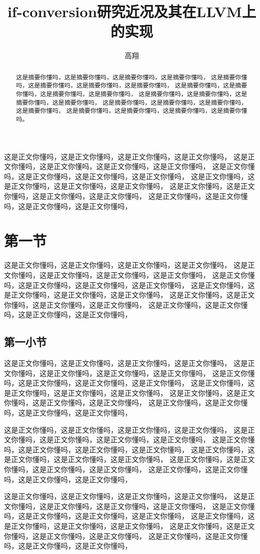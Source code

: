 \documentclass[11pt,a4paper]{article}
\title{if-conversion研究近况及其在LLVM上的实现}
\author{高翔}
\begin{document}
\maketitle

\begin{abstract}
这是摘要你懂吗，这是摘要你懂吗，这是摘要你懂吗，这是摘要你懂吗，
这是摘要你懂吗，这是摘要你懂吗，这是摘要你懂吗，这是摘要你懂吗，
这是摘要你懂吗，这是摘要你懂吗，这是摘要你懂吗，这是摘要你懂吗，
这是摘要你懂吗，这是摘要你懂吗，这是摘要你懂吗，这是摘要你懂吗，
这是摘要你懂吗，这是摘要你懂吗，这是摘要你懂吗，这是摘要你懂吗，
这是摘要你懂吗，这是摘要你懂吗，这是摘要你懂吗，这是摘要你懂吗。
\end{abstract}

这是正文你懂吗，这是正文你懂吗，这是正文你懂吗，这是正文你懂吗，
这是正文你懂吗，这是正文你懂吗，这是正文你懂吗，这是正文你懂吗，
这是正文你懂吗，这是正文你懂吗，这是正文你懂吗，这是正文你懂吗，
这是正文你懂吗，这是正文你懂吗，这是正文你懂吗，这是正文你懂吗，
这是正文你懂吗，这是正文你懂吗，这是正文你懂吗，这是正文你懂吗，
这是正文你懂吗，这是正文你懂吗，这是正文你懂吗，这是正文你懂吗，

\section{第一节}

这是正文你懂吗，这是正文你懂吗，这是正文你懂吗，这是正文你懂吗，
这是正文你懂吗，这是正文你懂吗，这是正文你懂吗，这是正文你懂吗，
这是正文你懂吗，这是正文你懂吗，这是正文你懂吗，这是正文你懂吗，
这是正文你懂吗，这是正文你懂吗，这是正文你懂吗，这是正文你懂吗，
这是正文你懂吗，这是正文你懂吗，这是正文你懂吗，这是正文你懂吗，
这是正文你懂吗，这是正文你懂吗，这是正文你懂吗，这是正文你懂吗，

\subsection{第一小节}

这是正文你懂吗，这是正文你懂吗，这是正文你懂吗，这是正文你懂吗，
这是正文你懂吗，这是正文你懂吗，这是正文你懂吗，这是正文你懂吗，
这是正文你懂吗，这是正文你懂吗，这是正文你懂吗，这是正文你懂吗，
这是正文你懂吗，这是正文你懂吗，这是正文你懂吗，这是正文你懂吗，
这是正文你懂吗，这是正文你懂吗，这是正文你懂吗，这是正文你懂吗，
这是正文你懂吗，这是正文你懂吗，这是正文你懂吗，这是正文你懂吗，

这是正文你懂吗，这是正文你懂吗，这是正文你懂吗，这是正文你懂吗，
这是正文你懂吗，这是正文你懂吗，这是正文你懂吗，这是正文你懂吗，
这是正文你懂吗，这是正文你懂吗，这是正文你懂吗，这是正文你懂吗，
这是正文你懂吗，这是正文你懂吗，这是正文你懂吗，这是正文你懂吗，
这是正文你懂吗，这是正文你懂吗，这是正文你懂吗，这是正文你懂吗，
这是正文你懂吗，这是正文你懂吗，这是正文你懂吗，这是正文你懂吗，

这是正文你懂吗，这是正文你懂吗，这是正文你懂吗，这是正文你懂吗，
这是正文你懂吗，这是正文你懂吗，这是正文你懂吗，这是正文你懂吗，
这是正文你懂吗，这是正文你懂吗，这是正文你懂吗，这是正文你懂吗，
这是正文你懂吗，这是正文你懂吗，这是正文你懂吗，这是正文你懂吗，
这是正文你懂吗，这是正文你懂吗，这是正文你懂吗，这是正文你懂吗，
这是正文你懂吗，这是正文你懂吗，这是正文你懂吗，这是正文你懂吗，
\end{document}

